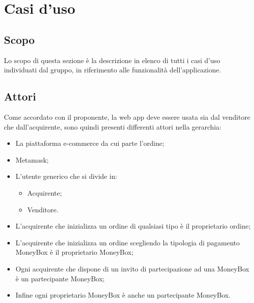 \section{Casi d'uso} \label{section:casi_uso}

\subsection{Scopo}
Lo scopo di questa sezione è la descrizione in elenco di tutti i casi d'uso individuati dal gruppo, in
riferimento alle funzionalità dell'applicazione.

\subsection{Attori}
Come accordato con il proponente, la web app\glo{} deve essere usata sia dal venditore che dall'acquirente,
sono quindi presenti differenti attori nella gerarchia: 
\begin{itemize}
    \item La piattaforma e-commerce\glo{} da cui parte l'ordine;
    \item Metamask\glo{};
    \item L'utente generico che si divide in:
        \begin{itemize}
            \item Acquirente;
            \item Venditore.
        \end{itemize}
    \item L'acquirente che inizializza un ordine di qualsiasi tipo è il proprietario ordine;
    \item L'acquirente che inizializza un ordine scegliendo la tipologia di pagamento MoneyBox\glo{} è il proprietario MoneyBox\glo{};
    \item Ogni acquirente che dispone di un invito di partecipazione ad una MoneyBox\glo{} è un partecipante MoneyBox\glo{};
    \item Infine ogni proprietario MoneyBox\glo{} è anche un partecipante MoneyBox\glo{}.
\end{itemize}

